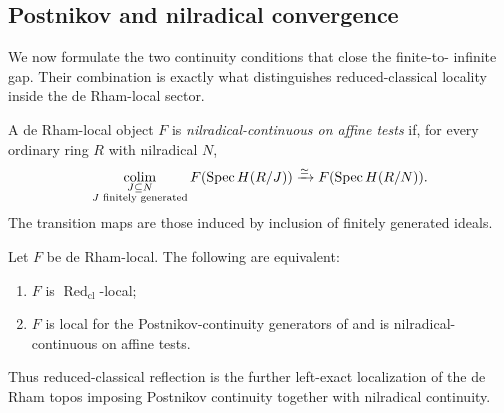\subsection{Postnikov and nilradical convergence}

We now formulate the two continuity conditions that close the finite-to-
infinite gap. Their combination is exactly what distinguishes
reduced-classical locality inside the de Rham-local sector.

\begin{definition}
A de Rham-local object \(F\) is \emph{nilradical-continuous on affine tests} if,
for every ordinary ring \(R\) with nilradical \(N\),
\[
  \operatorname*{colim}_{\substack{J\subseteq N\\J\text{ finitely generated}}}
  F(\operatorname{Spec} H(R/J))
  \xrightarrow{\simeq}
  F(\operatorname{Spec} H(R/N)).
\]
The transition maps are those induced by inclusion of finitely generated ideals.
\end{definition}

\begin{theorem}
\label{thm:reduced-convergence}
Let \(F\) be de Rham-local. The following are equivalent:
\begin{enumerate}
\item \(F\) is \(\operatorname{Red}_{\mathrm{cl}}\)-local;
\item \(F\) is local for the Postnikov-continuity generators of
 and is
nilradical-continuous on affine tests.
\end{enumerate}
Thus reduced-classical reflection is the further left-exact localization of the de
Rham topos imposing Postnikov continuity together with nilradical continuity.
\end{theorem}

